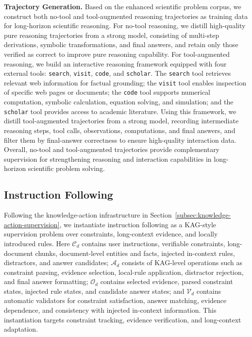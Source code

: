 \textbf{Trajectory Generation.} Based on the enhanced scientific problem corpus, we construct both no-tool and tool-augmented reasoning trajectories as training data for long-horizon scientific reasoning. For no-tool reasoning, we distill high-quality pure reasoning trajectories from a strong model, consisting of multi-step derivations, symbolic transformations, and final answers, and retain only those verified as correct to improve pure reasoning capability. For tool-augmented reasoning, we build an interactive reasoning framework equipped with four external tools: \texttt{search}, \texttt{visit}, \texttt{code}, and \texttt{scholar}. The \texttt{search} tool retrieves relevant web information for factual grounding; the \texttt{visit} tool enables inspection of specific web pages or documents; the \texttt{code} tool supports numerical computation, symbolic calculation, equation solving, and simulation; and the \texttt{scholar} tool provides access to academic literature. Using this framework, we distill tool-augmented trajectories from a strong model, recording intermediate reasoning steps, tool calls, observations, computations, and final answers, and filter them by final-answer correctness to ensure high-quality interaction data. Overall, no-tool and tool-augmented trajectories provide complementary supervision for strengthening reasoning and interaction capabilities in long-horizon scientific problem solving.

\subsection{Instruction Following}
\label{sec:if_data}

Following the knowledge-action infrastructure in Section~\ref{subsec:knowledge-action-supervision}, we instantiate instruction following as a KAG-style supervision problem over constraints, long-context evidence, and locally introduced rules. Here $\mathcal{C}_d$ contains user instructions, verifiable constraints, long-document chunks, document-level entities and facts, injected in-context rules, distractors, and answer candidates; $\mathcal{A}_d$ consists of KAG-level operations such as constraint parsing, evidence selection, local-rule application, distractor rejection, and final answer formatting; $\mathcal{O}_d$ contains selected evidence, parsed constraint states, injected rule states, and candidate answer states; and $\mathcal{V}_d$ contains automatic validators for constraint satisfaction, answer matching, evidence dependence, and consistency with injected in-context information. This instantiation targets constraint tracking, evidence verification, and long-context adaptation.

